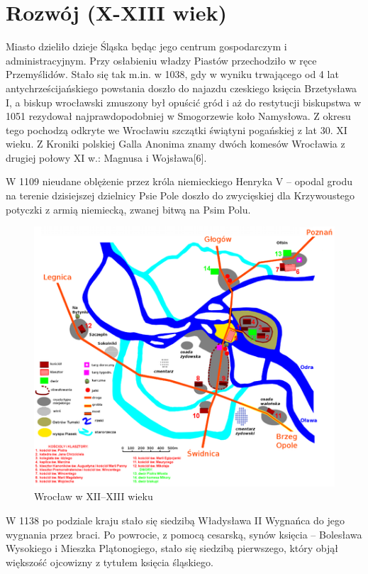 \documentclass{article}
\begin{document}
\section{Rozwój (X-XIII wiek)}
\hrulefill

Miasto dzieliło dzieje Śląska będąc jego centrum gospodarczym i administracyjnym. Przy osłabieniu władzy Piastów przechodziło w ręce Przemyślidów. Stało się tak m.in. w 1038, gdy w wyniku trwającego od 4 lat antychrześcijańskiego powstania doszło do najazdu czeskiego księcia Brzetysława I, a biskup wrocławski zmuszony był opuścić gród i aż do restytucji biskupstwa w 1051 rezydował najprawdopodobniej w Smogorzewie koło Namysłowa. Z okresu tego pochodzą odkryte we Wrocławiu szczątki świątyni pogańskiej z lat 30. XI wieku. Z Kroniki polskiej Galla Anonima znamy dwóch komesów Wrocławia z drugiej połowy XI w.: Magnusa i Wojsława[6].


W 1109 nieudane oblężenie przez króla niemieckiego Henryka V – opodal grodu na terenie dzisiejszej dzielnicy Psie Pole doszło do zwycięskiej dla Krzywoustego potyczki z armią niemiecką, zwanej bitwą na Psim Polu.
 \begin{figure}[h!]
\centering
\includegraphics[scale=0.4]{1.png}
\caption{Wrocław w XII–XIII wieku}
\end{figure}


W 1138 po podziale kraju stało się siedzibą Władysława II Wygnańca do jego wygnania przez braci. Po powrocie, z pomocą cesarską, synów księcia – Bolesława Wysokiego i Mieszka Plątonogiego, stało się siedzibą pierwszego, który objął większość ojcowizny z tytułem księcia śląskiego.
\end{document}
